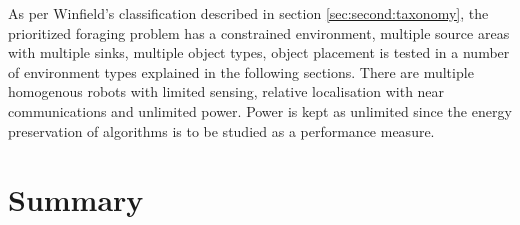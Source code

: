 As per Winfield's classification described in section \ref{sec:second:taxonomy}, the prioritized foraging problem has a constrained environment, multiple source areas with multiple sinks, multiple object types, object placement is tested in a number of environment types explained in the following sections. There are multiple homogenous robots with limited sensing, relative localisation with near communications and unlimited power. Power is kept as unlimited since the energy preservation of algorithms is to be studied as a performance measure. 

\section{Summary}
\label{sec:second:summary}

%
%